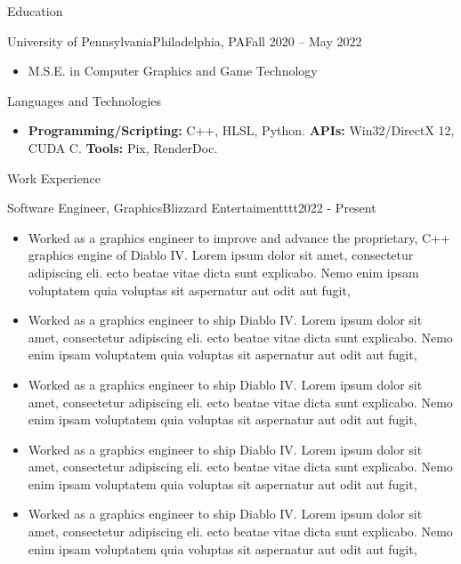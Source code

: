 \documentclass[]{mcdowellcv}
\begin{document}
	\makeheader
	

	\begin{cvsection}{Education}
		\begin{cvsubsection}{University of Pennsylvania}{Philadelphia, PA}{Fall 2020 -- May 2022}
			\begin{itemize}
				\item M.S.E. in Computer Graphics and Game Technology
			\end{itemize}
		\end{cvsubsection}
	\end{cvsection}

	\begin{cvsection}{Languages and Technologies}
		\begin{cvsubsection}{}{}{}	
			\begin{itemize}
				\item \textbf{Programming/Scripting:} C++, HLSL, Python. \textbf{APIs:} Win32/DirectX 12, CUDA C. \textbf{Tools:} Pix, RenderDoc.
			\end{itemize}
		\end{cvsubsection}
	\end{cvsection}

	\begin{cvsection}{Work Experience}
		\begin{cvsubsection}{Software Engineer, Graphics}{Blizzard Entertaimentttt}{2022 - Present}	
			\begin{itemize}
				\item Worked as a graphics engineer to improve and advance the proprietary, C++ graphics engine of Diablo IV. Lorem ipsum dolor sit amet, consectetur adipiscing eli. ecto beatae vitae dicta sunt explicabo. Nemo enim ipsam voluptatem quia voluptas sit aspernatur aut odit aut fugit, 
				\item Worked as a graphics engineer to ship Diablo IV. Lorem ipsum dolor sit amet, consectetur adipiscing eli. ecto beatae vitae dicta sunt explicabo. Nemo enim ipsam voluptatem quia voluptas sit aspernatur aut odit aut fugit, 
				\item Worked as a graphics engineer to ship Diablo IV. Lorem ipsum dolor sit amet, consectetur adipiscing eli. ecto beatae vitae dicta sunt explicabo. Nemo enim ipsam voluptatem quia voluptas sit aspernatur aut odit aut fugit, 
				\item Worked as a graphics engineer to ship Diablo IV. Lorem ipsum dolor sit amet, consectetur adipiscing eli. ecto beatae vitae dicta sunt explicabo. Nemo enim ipsam voluptatem quia voluptas sit aspernatur aut odit aut fugit, 
				\item Worked as a graphics engineer to ship Diablo IV. Lorem ipsum dolor sit amet, consectetur adipiscing eli. ecto beatae vitae dicta sunt explicabo. Nemo enim ipsam voluptatem quia voluptas sit aspernatur aut odit aut fugit, 
			\end{itemize}
		\end{cvsubsection}
	\end{cvsection}
	
\end{document}
